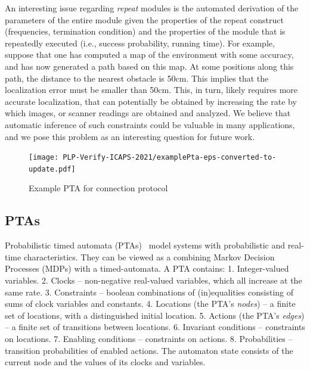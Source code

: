 \documentclass[letterpaper]{article}
\newcommand\note[1]{\todo[inline, color=red!40]{#1}}
\begin{document}
{%
An interesting issue regarding \textit{repeat} modules is the automated derivation of the parameters of the entire module given the properties of the repeat construct (frequencies, termination condition) and the properties of the module that is repeatedly executed (i.e., success probability, running time). For example, suppose that one has computed a map of the environment with some accuracy, and has now generated a path based on this map. At some positions along this
path, the distance to the nearest obstacle is 50cm. This implies that the localization error must be smaller than 50cm.
This, in turn, likely requires more accurate localization, that can potentially be obtained by increasing the rate by which images, or scanner readings are obtained and analyzed. We believe that automatic inference of such constraints could
be valuable in many applications, and we pose this problem as an interesting question for future work.
}


\begin{figure}[t]
\centering
\texttt{[image: PLP-Verify-ICAPS-2021/examplePta-eps-converted-to-update.pdf]}
\caption{Example PTA for connection protocol}
\label{fig:examplePTA}
\vspace{-0.2cm}
\end{figure}

\subsection{PTAs}
\par Probabilistic timed automata (PTAs)~\citep{PTA}  model systems with probabilistic and real-time characteristics. They can be viewed
as a combining Markov Decision Processes (MDPs) with a timed-automata.
A PTA contains: 1. Integer-valued variables. 2. Clocks -- non-negative real-valued variables, which all increase at the same rate. 3. Constraints -- boolean combinations of
(in)equalities consisting of sums of clock variables and constants.  4. Locations (the PTA's \textit{nodes}) -- a finite set of locations, with 
a distinguished initial location. 5. Actions (the PTA's \textit{edges}) -- a finite set of transitions between locations. 6. Invariant conditions -- constraints on locations. 7. Enabling conditions -- constraints on actions. 8. Probabilities -- transition probabilities of enabled actions. The automaton state consists of the current node and the values of its clocks and variables. 
\end{document}
